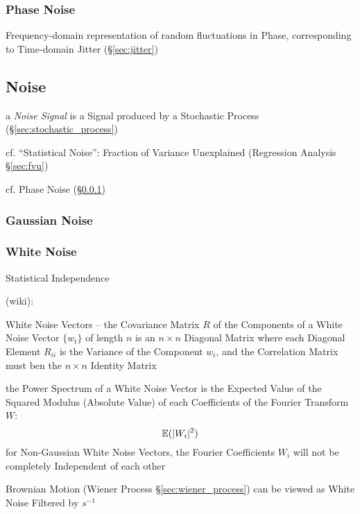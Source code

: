 \subsubsection{Phase Noise}\label{sec:phase_noise}

Frequency-domain representation of random fluctuations in Phase, corresponding
to Time-domain Jitter (\S\ref{sec:jitter})



\subsection{Noise}\label{sec:noise}

a \emph{Noise Signal} is a Signal produced by a Stochastic Process
(\S\ref{sec:stochastic_process})

cf. ``Statistical Noise'': Fraction of Variance Unexplained (Regression Analysis
\S\ref{sec:fvu})

cf. Phase Noise (\S\ref{sec:phase_noise})



\subsubsection{Gaussian Noise}\label{sec:gaussian_noise}

\subsubsection{White Noise}\label{sec:white_noise}

Statistical Independence

(wiki):

White Noise Vectors -- the Covariance Matrix $R$ of the Components of a White
Noise Vector $\{ w_t \}$ of length $n$ is an $n \times n$ Diagonal Matrix where
each Diagonal Element $R_{ii}$ is the Variance of the Component $w_i$, and the
Correlation Matrix must ben the $n \times n $ Identity Matrix

the Power Spectrum of a White Noise Vector is the Expected Value of the Squared
Modulus (Absolute Value) of each Coefficients of the Fourier Transform $W$:
\[
  \mathbb{E}(|W_i|^2)
\]
for Non-Gaussian White Noise Vectors, the Fourier Coefficients $W_i$ will not be
completely Independent of each other

Brownian Motion (Wiener Process \S\ref{sec:wiener_process}) can be viewed as
White Noise Filtered by $s^{-1}$

